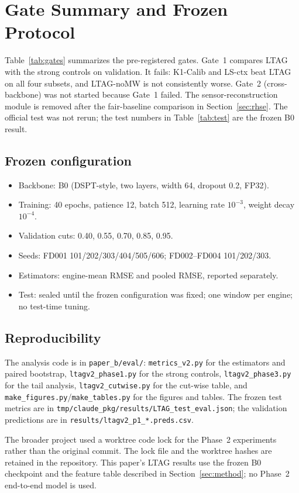 \section{Gate Summary and Frozen Protocol}
\label{app:gates}

Table~\ref{tab:gates} summarizes the pre-registered gates. Gate~1 compares LTAG
with the strong controls on validation. It fails: K1-Calib and LS-ctx beat LTAG
on all four subsets, and LTAG-noMW is not consistently worse. Gate~2
(cross-backbone) was not started because Gate~1 failed. The sensor-reconstruction
module is removed after the fair-baseline comparison in
Section~\ref{sec:rhse}. The official test was not rerun; the test numbers in
Table~\ref{tab:test} are the frozen B0 result.



\subsection{Frozen configuration}

\begin{itemize}
\item Backbone: B0 (DSPT-style, two layers, width 64, dropout 0.2, FP32).
\item Training: 40 epochs, patience 12, batch 512, learning rate $10^{-3}$,
weight decay $10^{-4}$.
\item Validation cuts: 0.40, 0.55, 0.70, 0.85, 0.95.
\item Seeds: FD001 101/202/303/404/505/606; FD002--FD004 101/202/303.
\item Estimators: engine-mean RMSE and pooled RMSE, reported separately.
\item Test: sealed until the frozen configuration was fixed; one window per
engine; no test-time tuning.
\end{itemize}

\subsection{Reproducibility}

The analysis code is in \texttt{paper\_b/eval/}: \texttt{metrics\_v2.py} for the
estimators and paired bootstrap, \texttt{ltagv2\_phase1.py} for the strong
controls, \texttt{ltagv2\_phase3.py} for the tail analysis,
\texttt{ltagv2\_cutwise.py} for the cut-wise table, and
\texttt{make\_figures.py}/\texttt{make\_tables.py} for the figures and tables.
The frozen test metrics are in \texttt{tmp/claude\_pkg/results/LTAG\_test\_eval.json};
the validation predictions are in \texttt{results/ltagv2\_p1\_*.preds.csv}.

The broader project used a worktree code lock for the Phase~2 experiments rather
than the original commit. The lock file and the worktree hashes are retained in
the repository. This paper's LTAG results use the frozen B0 checkpoint and the
feature table described in Section~\ref{sec:method}; no Phase~2 end-to-end model
is used.
